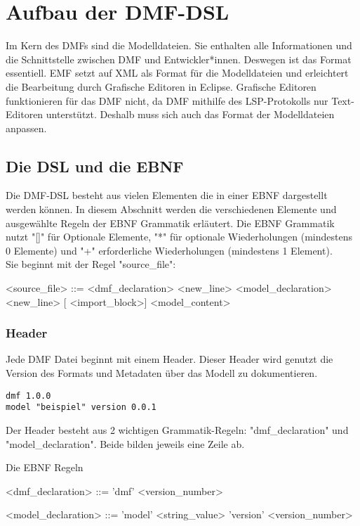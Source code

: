 \documentclass[./einleitung.tex]{subfiles}
\begin{document}
\section{Aufbau der DMF-DSL}
Im Kern des DMFs sind die Modelldateien. Sie enthalten alle Informationen und die Schnittstelle zwischen DMF und Entwickler*innen.
Deswegen ist das Format essentiell. EMF setzt auf XML als Format für die Modelldateien und erleichtert die Bearbeitung durch Grafische Editoren in Eclipse.
Grafische Editoren funktionieren für das DMF nicht, da DMF mithilfe des LSP-Protokolls nur Text-Editoren unterstützt.
Deshalb muss sich auch das Format der Modelldateien anpassen.

\subsection{Die DSL und die EBNF}
Die DMF-DSL besteht aus vielen Elementen die in einer EBNF dargestellt werden können. In diesem Abschnitt werden die verschiedenen Elemente und ausgewählte Regeln der EBNF Grammatik erläutert.\newline \newline
Die EBNF Grammatik nutzt "[]" für Optionale Elemente, "*" für optionale Wiederholungen (mindestens 0 Elemente) und "+" erforderliche Wiederholungen (mindestens 1 Element).  \\
Sie beginnt mit der Regel "source_file":
\begin{grammar}
<source_file> ::= <dmf_declaration> <new_line> <model_declaration> <new_line> [ <import_block>] <model_content>
\end{grammar}

\subsubsection{Header}
Jede DMF Datei beginnt mit einem Header. Dieser Header wird genutzt die Version des Formats und Metadaten über das Modell zu dokumentieren.
\begin{lstlisting}[caption={Header einer DMF-Modelldatei}]
dmf 1.0.0
model "beispiel" version 0.0.1
\end{lstlisting}
Der Header besteht aus 2 wichtigen Grammatik-Regeln: "dmf_declaration" und "model_declaration". Beide bilden jeweils eine Zeile ab.
\begin{myenv}
\caption{Die EBNF Regeln}
\begin{grammar}
<dmf_declaration> ::= 'dmf' <version_number>

<model_declaration> ::= 'model' <string_value> 'version' <version_number>
\end{grammar}
\end{myenv}
\end{document}
